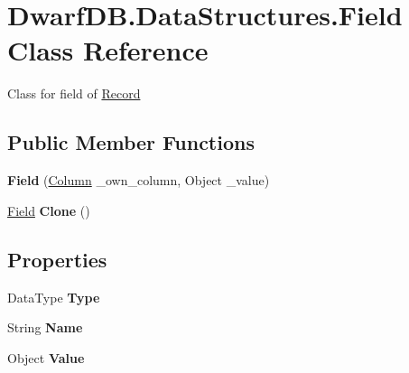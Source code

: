 \hypertarget{class_dwarf_d_b_1_1_data_structures_1_1_field}{\section{Dwarf\+D\+B.\+Data\+Structures.\+Field Class Reference}
\label{class_dwarf_d_b_1_1_data_structures_1_1_field}
}


Class for field of \hyperlink{class_dwarf_d_b_1_1_data_structures_1_1_record}{Record}  


\subsection*{Public Member Functions}
\begin{DoxyCompactItemize}
\item 
\hypertarget{class_dwarf_d_b_1_1_data_structures_1_1_field_a06c424109f689ccccbac38deba67e489}{{\bfseries Field} (\hyperlink{class_dwarf_d_b_1_1_data_structures_1_1_column}{Column} \+\_\+own\+\_\+column, Object \+\_\+value)}\label{class_dwarf_d_b_1_1_data_structures_1_1_field_a06c424109f689ccccbac38deba67e489}

\item 
\hypertarget{class_dwarf_d_b_1_1_data_structures_1_1_field_a4772b2645a7b03be6800261db6a3c816}{\hyperlink{class_dwarf_d_b_1_1_data_structures_1_1_field}{Field} {\bfseries Clone} ()}\label{class_dwarf_d_b_1_1_data_structures_1_1_field_a4772b2645a7b03be6800261db6a3c816}

\end{DoxyCompactItemize}
\subsection*{Properties}
\begin{DoxyCompactItemize}
\item 
\hypertarget{class_dwarf_d_b_1_1_data_structures_1_1_field_a147e0dff27a89485bf91437d931fe5b5}{Data\+Type {\bfseries Type}}\label{class_dwarf_d_b_1_1_data_structures_1_1_field_a147e0dff27a89485bf91437d931fe5b5}

\item 
\hypertarget{class_dwarf_d_b_1_1_data_structures_1_1_field_a5c1af79be209e13f5da11e4c033f1fdb}{String {\bfseries Name}}\label{class_dwarf_d_b_1_1_data_structures_1_1_field_a5c1af79be209e13f5da11e4c033f1fdb}

\item 
\hypertarget{class_dwarf_d_b_1_1_data_structures_1_1_field_ac7d7ebd43b9010ed2a7767a296e90d6f}{Object {\bfseries Value}}\label{class_dwarf_d_b_1_1_data_structures_1_1_field_ac7d7ebd43b9010ed2a7767a296e90d6f}

\end{DoxyCompactItemize}


